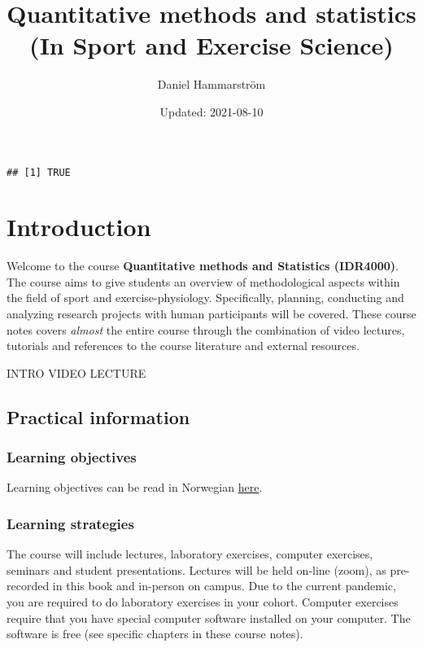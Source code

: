 \documentclass[
  11pt,
]{krantz}
\title{Quantitative methods and statistics (In Sport and Exercise Science)}
\author{Daniel Hammarström}
\date{Updated: 2021-08-10}
\begin{document}
\maketitle

{
\hypersetup{linkcolor=}
\setcounter{tocdepth}{2}
\tableofcontents
}
\listoftables
\listoffigures
\begin{verbatim}
## [1] TRUE
\end{verbatim}

\hypertarget{introduction}{%
\chapter{Introduction}\label{introduction}}

Welcome to the course \textbf{Quantitative methods and Statistics (IDR4000)}. The course aims to give students an overview of methodological aspects within the field of sport and exercise-physiology. Specifically, planning, conducting and analyzing research projects with human participants will be covered. These course notes covers \emph{almost} the entire course through the combination of video lectures, tutorials and references to the course literature and external resources.

INTRO VIDEO LECTURE

\hypertarget{practical-information}{%
\section{Practical information}\label{practical-information}}

\hypertarget{learning-objectives}{%
\subsection{Learning objectives}\label{learning-objectives}}

Learning objectives can be read in Norwegian \href{https://www.inn.no/content/view/full/163709/language/nor-NO}{here}.

\hypertarget{learning-strategies}{%
\subsection{Learning strategies}\label{learning-strategies}}

The course will include lectures, laboratory exercises, computer exercises, seminars and student presentations. Lectures will be held on-line (zoom), as pre-recorded in this book and in-person on campus. Due to the current pandemic, you are required to do laboratory exercises in your cohort. Computer exercises require that you have special computer software installed on your computer. The software is free (see specific chapters in these course notes).
\end{document}
